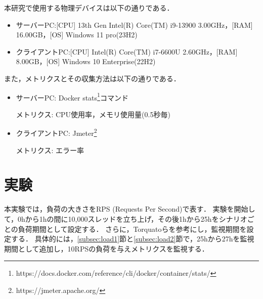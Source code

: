 \documentclass[twoside,twocolumn,10pt]{jarticle}  %
\begin{document}
本研究で使用する物理デバイスは以下の通りである．
\begin{itemize}
  \setlength{\parskip}{0cm} %
  \setlength{\itemsep}{0cm} %
  \item サーバーPC:[CPU] 13th Gen Intel(R) Core(TM) i9-13900 3.00GHz，[RAM] 16.00GB，[OS] Windows 11 pro(23H2)
  \item クライアントPC:[CPU] Intel(R) Core(TM) i7-6600U 2.60GHz，[RAM] 8.00GB，[OS] Windows 10 Enterprise(22H2)
\end{itemize}
また，メトリクスとその収集方法は以下の通りである．
\begin{itemize}
  \setlength{\parskip}{0cm} %
  \setlength{\itemsep}{0cm} %
  \item サーバーPC: Docker stats\footnote{https://docs.docker.com/reference/cli/docker/container/stats/}コマンド\par
  メトリクス: CPU使用率，メモリ使用量(0.5秒毎)
  \item クライアントPC: Jmeter\footnote{https://jmeter.apache.org/}\par
  メトリクス: エラー率
\end{itemize}

\section{実験}
本実験では，負荷の大きさをRPS (Requests Per Second)で表す．
実験を開始して，0hから1hの間に10,000スレッドを立ち上げ，その後1hから25hをシナリオごとの負荷期間として設定する．
さらに，Torquatoら\cite{Torquato2018SWAREa}を参考にし，監視期間を設定する．
具体的には，\ref{subsec:load1}節と\ref{subsec:load2}節で，25hから27hを監視期間として追加し，10RPSの負荷を与えメトリクスを監視する．
\end{document}
